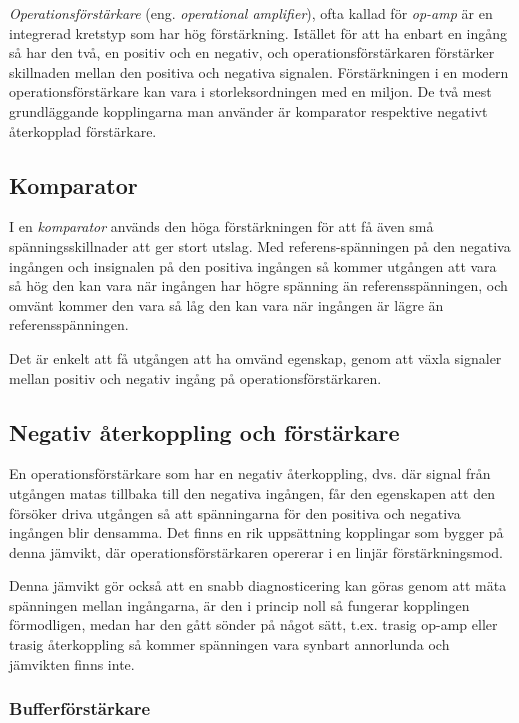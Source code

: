\emph{Operationsförstärkare} (eng. \emph{operational amplifier}), ofta kallad
för \emph{op-amp} är en integrerad kretstyp som har hög förstärkning.
Istället för att ha enbart en ingång så har den två, en positiv
och en negativ, och operationsförstärkaren förstärker skillnaden mellan den
positiva och negativa signalen. Förstärkningen i en modern operationsförstärkare
kan vara i storleksordningen med en miljon.
De två mest grundläggande kopplingarna man använder är komparator respektive
negativt återkopplad förstärkare.

\subsection{Komparator}

I en \emph{komparator} används den höga förstärkningen för att få även små
spänningsskillnader att ger stort utslag. Med referens-spänningen på den
negativa ingången och insignalen på den positiva ingången så kommer utgången
att vara så hög den kan vara när ingången har högre spänning än
referensspänningen, och omvänt kommer den vara så låg den kan vara när ingången
är lägre än referensspänningen.

Det är enkelt att få utgången att ha omvänd egenskap, genom att växla signaler
mellan positiv och negativ ingång på operationsförstärkaren.

\subsection{Negativ återkoppling och förstärkare}

En operationsförstärkare som har en negativ återkoppling, dvs. där signal från
utgången matas tillbaka till den negativa ingången, får den egenskapen att den
försöker driva utgången så att spänningarna för den positiva och negativa
ingången blir densamma.
Det finns en rik uppsättning kopplingar som bygger på denna jämvikt, där
operationsförstärkaren opererar i en linjär förstärkningsmod.

Denna jämvikt gör också att en snabb diagnosticering kan göras genom att mäta
spänningen mellan ingångarna, är den i princip noll så fungerar kopplingen
förmodligen, medan har den gått sönder på något sätt, t.ex. trasig op-amp
eller trasig återkoppling så kommer spänningen vara synbart annorlunda och
jämvikten finns inte.

\subsubsection{Bufferförstärkare}

